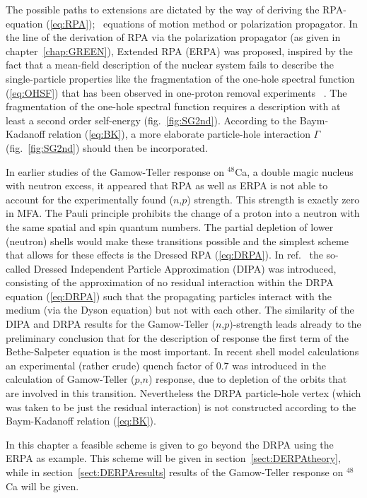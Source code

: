 The possible paths to extensions%
\cite{BAD90,TSA88a,Saw62,BH82,YDG83,DNS90,HDA86}
 are dictated by the way of deriving the 
RPA-equation (\ref{eq:RPA}); \eg\ equations of motion method\cite{RS80} or
polarization propagator\cite{FW71}. In the line of the derivation of RPA via
the polarization propagator (as given in chapter~\ref{chap:GREEN}), Extended
RPA (ERPA) was proposed\cite{BAD90}, inspired by the fact that a mean-field
description of the nuclear system fails to describe the single-particle 
properties like the fragmentation of the one-hole spectral function 
(\ref{eq:OHSF}) that has been observed in one-proton removal experiments \eep\
\cite{HBJ88,Qu88a,Kr90,Ste91}.
The fragmentation of the one-hole spectral function requires a description 
with at least a second order self-energy (fig.~\ref{fig:SG2nd}). According to 
the Baym-Kadanoff relation (\ref{eq:BK}), a more elaborate particle-hole
interaction $\Gamma$ (fig.~\ref{fig:SG2nd}) should then be incorporated.

In earlier studies of the Gamow-Teller response on $^{48}$Ca, a double magic 
nucleus with neutron excess, it appeared that RPA as well as ERPA is not 
able to account for the experimentally found ($n$,$p$) strength. This strength 
is exactly zero in MFA. The Pauli principle prohibits the change of a 
proton into a neutron with the same spatial and spin quantum numbers. 
The partial 
depletion of lower (neutron) shells would make these transitions possible and 
the simplest scheme that allows for these effects is the Dressed 
RPA\cite{RGBA93} (\ref{eq:DRPA}).
In ref.~\cite{RGBA93} the so-called Dressed Independent Particle Approximation
(DIPA) was introduced, consisting of the approximation of no residual 
interaction within the DRPA equation (\ref{eq:DRPA}) such that the 
propagating particles interact with the medium (via the Dyson equation) but 
not with each other.
The similarity of the DIPA and DRPA results for the Gamow-Teller 
($n$,$p$)-strength leads already to the preliminary conclusion\cite{RGBA93} 
that for the description of response the first term of the Bethe-Salpeter 
equation is the most important. 
In recent shell model calculations\cite{CPS95} an experimental (rather crude) 
quench factor of $0.7$
was introduced in the calculation of Gamow-Teller ($p$,$n$) response, due 
to depletion of the orbits that are involved in this transition.
Nevertheless the DRPA particle-hole vertex (which was
taken to be just the residual interaction) is not constructed according to the
Baym-Kadanoff relation (\ref{eq:BK}). 

In this chapter a feasible scheme is given to go beyond the DRPA using the
ERPA as example. This scheme will be given in section~\ref{sect:DERPAtheory}, 
while in section~\ref{sect:DERPAresults} results of the Gamow-Teller response
on $^{48}$Ca will be given.

